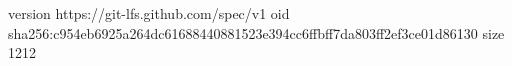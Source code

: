 version https://git-lfs.github.com/spec/v1
oid sha256:c954eb6925a264dc61688440881523e394cc6ffbff7da803ff2ef3ce01d86130
size 1212
